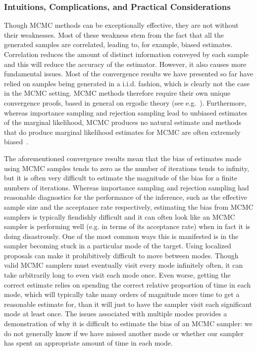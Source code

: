 \subsubsection{Intuitions, Complications, and Practical Considerations}
\label{sec:inf:foundation:mcmc:intuitions}

Though MCMC methods can be exceptionally effective, they are not without their weaknesses.
Most of these weakness stem from the fact that all the generated samples are correlated, leading to, for
example, biased estimates.  
Correlation reduces the amount of distinct information conveyed by 
each sample and this will reduce the accuracy of the estimator.  However, it also causes more fundamental
issues.
Most of the convergence results we have presented so far have relied on samples being generated in a i.i.d. 
fashion, which is clearly not the case in the MCMC setting.  MCMC methods therefore require their own
unique convergence proofs, based in general on ergodic theory (see e.g.~\cite[Chapter 6]{durrett2010probability}).
Furthermore, whereas importance sampling and rejection sampling lead to
unbiased estimates of the marginal likelihood, MCMC produces no natural estimate and methods
that do produce marginal likelihood estimates for MCMC are often extremely biased~\citep{chib2001marginal}.

The aforementioned convergence results mean that the bias of estimates made using MCMC samples tends to zero
as the number of iterations tends to infinity, but it is often very difficult to estimate the magnitude of the bias for
a finite numbers of iterations.  Whereas importance sampling and rejection sampling had reasonable
diagnostics for the performance of the inference, such as the effective sample size and the acceptance
rate respectively, estimating the bias from MCMC samplers is typically fiendishly difficult and it can
often look like an MCMC sampler is performing well (e.g. in terms of its acceptance rate) when in fact it is doing disastrously.  
One of the most common ways this is manifested is in the sampler becoming stuck in a particular 
mode of the target.  Using localized proposals can make
it prohibitively difficult to move between modes.  Though valid MCMC samplers must eventually
visit every mode infinitely often, it can take arbitrarily long to even visit each mode once.  Even worse,
getting the correct estimate relies on spending the correct relative proportion of time in each mode, which
will typically take many orders of magnitude more time to get a reasonable estimate for, than it will just to
have the sampler visit each significant mode at least once.  The issues associated with multiple modes
provides a demonstration of why it is difficult to estimate the bias of an MCMC sampler: we do not
generally know if we have missed another mode or 
whether our sampler has spent an appropriate amount of time in each mode.

